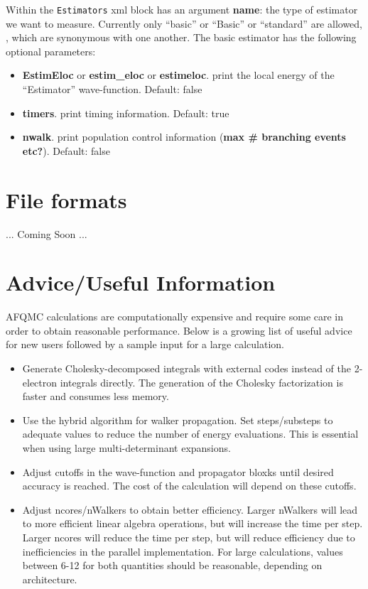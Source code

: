 Within the \texttt{Estimators} xml block has an argument \textbf{name}: the type of estimator we want to measure. Currently only ``basic'' or ``Basic'' or ``standard'' are allowed, , which are synonymous with one another. The basic estimator has the following optional parameters:
\begin{itemize}
\item \textbf{EstimEloc} or \textbf{estim\_eloc} or \textbf{estimeloc}. print the local energy of the ``Estimator'' wave-function. Default: false
\item \textbf{timers}. print timing information. Default: true
\item \textbf{nwalk}. print population control information ({\bf max \# branching events etc?}). Default: false \\
\end{itemize}

\section{File formats}
... Coming Soon ...

\section{Advice/Useful Information}

AFQMC calculations are computationally expensive and require some care in order to obtain reasonable performance.
Below is a growing list of useful advice for new users followed by a sample input for a large calculation.
\begin{itemize}
\item Generate Cholesky-decomposed integrals with external codes instead of the 2-electron integrals directly. The generation of the Cholesky factorization is faster and consumes less memory. 
\item Use the hybrid algorithm for walker propagation. Set steps/substeps to adequate values to reduce the number of energy evaluations. This is essential when using large multi-determinant expansions.
\item Adjust cutoffs in the wave-function and propagator bloxks until desired accuracy is reached. The cost of the calculation will depend on these cutoffs.
\item Adjust ncores/nWalkers to obtain better efficiency. Larger nWalkers will lead to more efficient linear algebra operations, but will increase the time per step. Larger ncores will reduce the time per step, but will reduce efficiency due to inefficiencies in the parallel implementation. For large calculations, values between 6-12 for both quantities should be reasonable, depending on architecture. 
\end{itemize}

